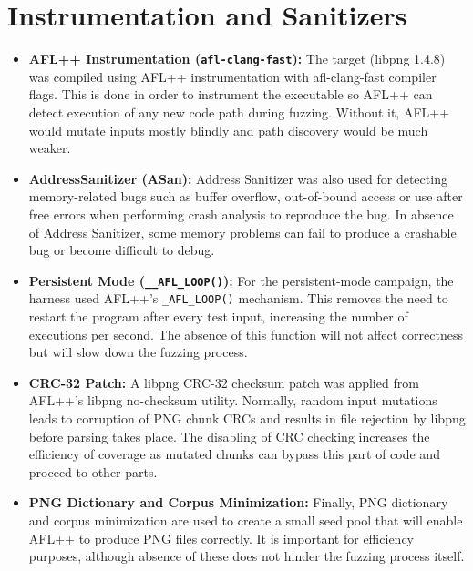 \documentclass[letterpaper,twocolumn,10pt]{article}
\begin{document}
\section {Instrumentation and Sanitizers}
\begin{itemize}[leftmargin=*,noitemsep,topsep=2pt]
    \item \textbf{AFL++ Instrumentation (\texttt{afl-clang-fast}):}
The target (libpng 1.4.8) was compiled using AFL++ instrumentation with afl-clang-fast compiler flags. This is done in order to instrument the executable so AFL++ can detect execution of any new code path during fuzzing. Without it, AFL++ would mutate inputs mostly blindly and path discovery would be much weaker.
\item \textbf{AddressSanitizer (ASan):}
Address Sanitizer was also used for detecting memory-related bugs such as buffer overflow, out-of-bound access or use after free errors when performing crash analysis to reproduce the bug. In absence of Address Sanitizer, some memory problems can fail to produce a crashable bug or become difficult to debug.
\item \textbf{Persistent Mode (\texttt{\_\_AFL\_LOOP()}):}
For the persistent-mode campaign, the harness used  AFL++’s \texttt{\_AFL\_LOOP()} mechanism. This removes the need to restart the program after every test input, increasing the number of executions per second. The absence of this function will not affect correctness but will slow down the fuzzing process.
 \item \textbf{CRC-32 Patch:}
A libpng CRC-32 checksum patch was applied from AFL++’s libpng no-checksum utility. Normally, random input mutations leads to corruption of PNG chunk CRCs and results in file rejection by libpng before parsing takes place. The disabling of CRC checking increases the efficiency of coverage as mutated chunks can bypass this part of code and proceed to other parts.
 \item \textbf{PNG Dictionary and Corpus Minimization:}
Finally, PNG dictionary and corpus minimization are used to create a small seed pool that will enable AFL++ to produce PNG files correctly. It is important for efficiency purposes, although absence of these does not hinder the fuzzing process itself.
\end{itemize}








{\footnotesize 
}

\theendnotes

\clearpage
\onecolumn
\appendix
\renewcommand{\thefigure}{\thesection.\arabic{figure}}



\end{document}
